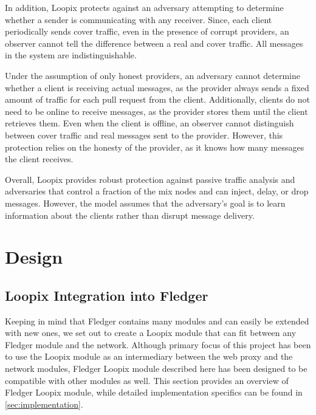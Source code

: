 \documentclass[a4paper,11pt,oneside]{report}
\begin{document}
In addition, Loopix protects against an adversary attempting to determine whether a sender is communicating with any receiver. Since, each client periodically sends cover traffic, even in the presence of corrupt providers, an observer cannot tell the difference between a real and cover traffic. All messages in the system are indistinguishable.

Under the assumption of only honest providers, an adversary cannot determine whether a client is receiving actual messages, as the provider always sends a fixed amount of traffic for each pull request from the client. Additionally, clients do not need to be online to receive messages, as the provider stores them until the client retrieves them. Even when the client is offline, an observer cannot distinguish between cover traffic and real messages sent to the provider. However, this protection relies on the honesty of the provider, as it knows how many messages the client receives.

Overall, Loopix provides robust protection against passive traffic analysis and adversaries that control a fraction of the mix nodes and can inject, delay, or drop messages. However, the model assumes that the adversary’s goal is to learn information about the clients rather than disrupt message delivery.

\chapter{Design}



\section{Loopix Integration into Fledger}
Keeping in mind that Fledger contains many modules and can easily be extended with new ones, we set out to create a Loopix module that can fit between any Fledger module and the network. Although primary focus of this project has been to use the Loopix module as an intermediary between the web proxy and the network modules, Fledger Loopix module described here has been designed to be compatible with other modules as well. This section provides an overview of Fledger Loopix module, while detailed implementation specifics can be found in \autoref{sec:implementation}.
\end{document}
